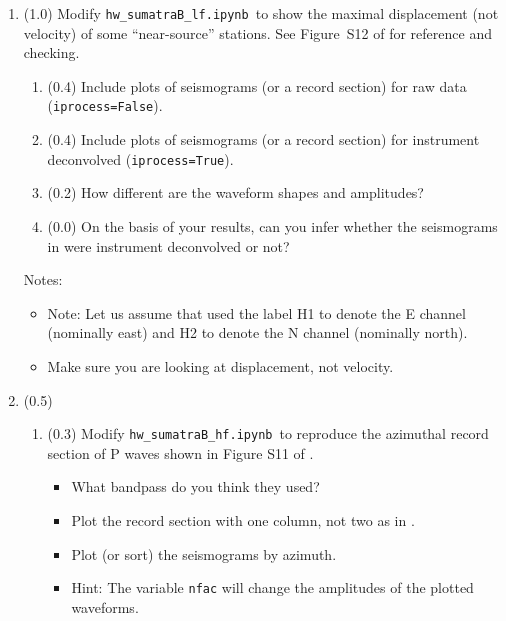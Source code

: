 \documentclass[11pt,titlepage,fleqn]{article}
\newcommand{\tfilelf}{{\tt hw\_sumatraB\_lf.ipynb}}
\newcommand{\tfilehf}{{\tt hw\_sumatraB\_hf.ipynb}}
\begin{document}
\begin{enumerate}
\item (1.0) Modify \tfilelf\ to show the maximal displacement (not velocity) of some ``near-source'' stations. See Figure~S12 of \citet{Ammon2005} for reference and checking.

%
\begin{enumerate}
\item (0.4) Include plots of seismograms (or a record section) for raw data (\verb+iprocess=False+).
\item (0.4) Include plots of seismograms (or a record section) for instrument deconvolved (\verb+iprocess=True+).
\item (0.2) How different are the waveform shapes and amplitudes?
\item (0.0) On the basis of your results, can you infer whether the seismograms in \citet{Ammon2005} were instrument deconvolved or not?
\end{enumerate}
%
Notes:
%
\begin{itemize}
\item Note: Let us assume that \citet{Ammon2005} used the label H1 to denote the E channel (nominally east) and H2 to denote the N channel (nominally north).

\item Make sure you are looking at displacement, not velocity.

\end{itemize}


\item (0.5) \ptag\
%
\begin{enumerate}
\item (0.3) Modify \tfilehf\ to reproduce the azimuthal record section of P waves shown in Figure S11 of \citet{Ammon2005}.
%
\begin{itemize}
\item What bandpass do you think they used?
\item Plot the record section with one column, not two as in \citet{Ammon2005}.
\item Plot (or sort) the seismograms by azimuth.
\item Hint: The variable \verb+nfac+ will change the amplitudes of the plotted waveforms.
\end{itemize}


\end{enumerate}
\end{enumerate}
\end{document}
